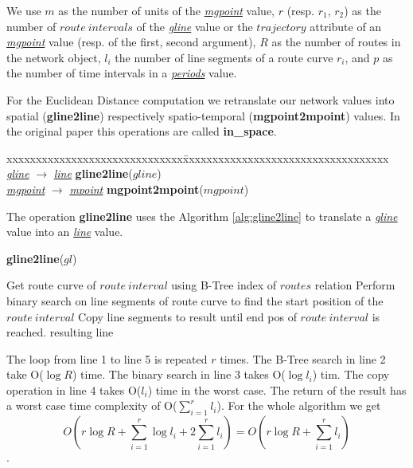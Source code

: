 \documentclass[a4paper]{article}
\newcommand{\op}[1]{\textbf{#1}}
\newcommand{\dt}[1]{\textsl{\underline{#1}}}
\begin{document}
We use $m$ as the number of units of the \dt{mgpoint} value,
$r$ (resp. $r_1$, $r_2$) as the number of $route\ intervals$ of the \dt{gline}
value or the $trajectory$ attribute of an \dt{mgpoint} value (resp. of the
first, second argument), $R$ as the number of routes in the network object, $l_i$
the number of line segments of a route curve $r_i$,
and $p$ as the number of time intervals in a \dt{periods} value.

For the Euclidean Distance computation we retranslate our network values into
spatial (\op{gline2line}) respectively spatio-temporal (\op{mgpoint2mpoint})
values. In the original paper this operations are called \op{in\_space}.
\begin{tabbing}
xxxxxxxxxxxxxxxxxxxxxxxxxxxxxx\=xxxxxxxxxxxxxxxxxxxxxxxxxxxxxxxxxxx\kill
\dt{gline} $\rightarrow$ \dt{line} \> \op{gline2line}($gline$) \\
\dt{mgpoint} $\rightarrow$ \dt{mpoint} \> \op{mgpoint2mpoint}($mgpoint$)\\
\end{tabbing}
The operation \op{gline2line} uses the Algorithm \ref{alg:gline2line} to
translate a \dt{gline} value into an \dt{line} value.
\begin{algorithm}[H]
  \caption{\op{gline2line}($gl$)}
  \label{alg:gline2line}
  \begin{algorithmic}[1]
      \STATE Get route curve of $route\ interval$ using B-Tree index of $routes$ relation
      \STATE Perform binary search on line segments of route curve to find the
      start position of the $route\ interval$
      \STATE Copy line segments to result until end pos of $route\ interval$ is
reached.
    \ENDFOR
    \RETURN resulting line
  \end{algorithmic}
\end{algorithm}
The loop from line 1 to
line 5 is repeated $r$ times. The B-Tree search in line 2 take O($\log{R}$)
time. The binary search in line 3 takes O($\log l_i$) tim. The copy operation in line 4 takes
O($l_i$) time in the worst case. The return of the result has a worst case
time complexity of O($\sum_{i=1}^{r}{l_i}$). For the whole algorithm we
get
\[O(r \log{R} + \sum_{i=1}^{r}{\log{l_i}} + 2\sum_{i=1}^{r}{l_i})
= O(r \log{R} + \sum_{i=1}^{r}{l_i})\].
\end{document}
